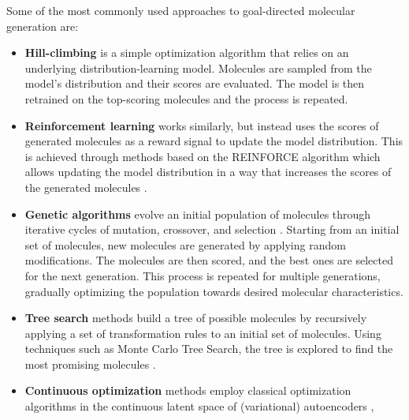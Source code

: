 Some of the most commonly used approaches to goal-directed molecular generation are:
\begin{itemize}
    \item \textbf{Hill-climbing}
          \citep{seglerGeneratingFocusedMolecule2018,xieMARSMarkovMolecular2021,thomasAugmentedHillClimbIncreases2022}
          is a simple optimization algorithm that relies on an underlying distribution-learning model.
          Molecules are sampled from the model's distribution and their scores are evaluated.
          The model is then retrained on the top-scoring molecules and the process is repeated.
    \item \textbf{Reinforcement learning} works similarly, but instead uses the scores of
          generated molecules as a reward signal to update the model distribution. This is
          achieved through methods based on the REINFORCE algorithm
          \citep{williamsSimpleStatisticalGradientfollowing1992} which allows updating the model
          distribution in a way that increases the scores of the generated molecules
          \citep{olivecronaMolecularDenovoDesign2017,thomasAugmentedHillClimbIncreases2022,youGraphConvolutionalPolicy2019,guoAugmentedMemoryCapitalizing2023}.
    \item \textbf{Genetic algorithms} evolve an initial population of molecules through iterative
          cycles of mutation, crossover, and selection
          \citep{jensenGraphbasedGeneticAlgorithm2019,nigamGenerativeModelsSuperfast2021,yoshikawaPopulationbasedNovoMolecule2018}.
          Starting from an initial set of molecules, new molecules are generated by applying random
          modifications. The molecules are then scored, and the best ones are selected for the
          next generation. This process is repeated for multiple generations, gradually optimizing
          the population towards desired molecular characteristics.
    \item \textbf{Tree search} methods build a tree of possible molecules by recursively applying a set of transformation rules
          to an initial set of molecules. Using techniques such as Monte Carlo Tree Search, the tree is
          explored to find the most promising molecules \citep{yangChemTSEfficientPython2017,jensenGraphbasedGeneticAlgorithm2019}.
    \item \textbf{Continuous optimization} methods employ classical optimization algorithms in the
          continuous latent space of (variational) autoencoders
          \citep{gomez-bombarelliAutomaticChemicalDesign2018,kusnerGrammarVariationalAutoencoder2017,winterEfficientMultiobjectiveMolecular2019},

\end{itemize}
